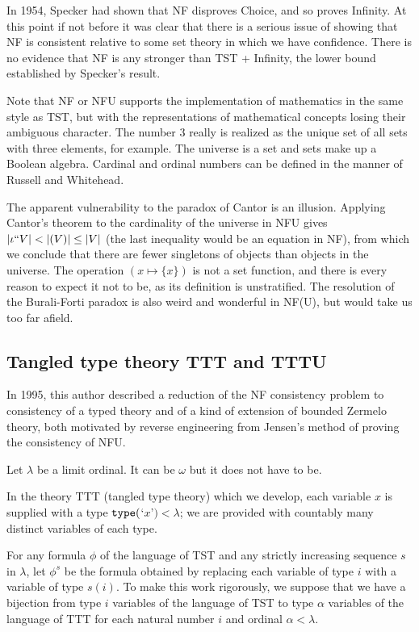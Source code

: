 \documentclass[12pt]{article}
\begin{document}
In 1954, Specker had shown that NF disproves Choice, and so proves Infinity.  At this point if not before it was clear that there is a serious issue of showing that NF is consistent relative to some set theory in which we have confidence.  There is no evidence that NF is any stronger than TST + Infinity, the lower bound established by Specker's result.

Note that NF or NFU supports the implementation of mathematics in the same style as TST, but with the representations of mathematical concepts losing their ambiguous character.  The number 3 really is realized as the unique set of all sets with three elements, for example.  The universe is a set and sets make up a Boolean algebra.   Cardinal and ordinal numbers can be defined
in the manner of Russell and Whitehead.

The apparent vulnerability to the paradox of Cantor is an illusion.  Applying Cantor's theorem to the cardinality of the universe in NFU gives $|\iota``V| < |{\cal }(V)| \leq |V|$ (the last inequality would be an equation in NF), from which we conclude that there are fewer singletons of objects than objects in the universe.  The operation $(x \mapsto \{x\})$ is not a set function, and there is every reason to expect it not to be, as its definition is unstratified.  The resolution of the Burali-Forti paradox is also weird and wonderful in NF(U), but would take us too far afield.

\newpage

\subsection{Tangled type theory TTT and TTTU}

In 1995, this author described a reduction of the NF consistency problem to consistency of a typed theory and of a kind of extension of bounded Zermelo theory, both motivated by reverse engineering from Jensen's method of proving the consistency of NFU.

Let $\lambda$ be a limit ordinal.  It can be $\omega$ but it does not have to be.  

In the theory TTT (tangled type theory) which we develop, each variable $x$ is supplied with a type ${\tt type}($`$x$'$) <\lambda$;  we are provided with countably many distinct variables of each type.

For any formula $\phi$ of the language of TST and any strictly increasing sequence $s$ in $\lambda$, let $\phi^s$ be the formula obtained by replacing each variable
of type $i$ with a variable of type $s(i)$.  To make this work rigorously, we suppose that we have a bijection from type $i$ variables of the language of TST to type $\alpha$ variables
of the language of TTT for each natural number $i$ and ordinal $\alpha<\lambda$.
\end{document}
